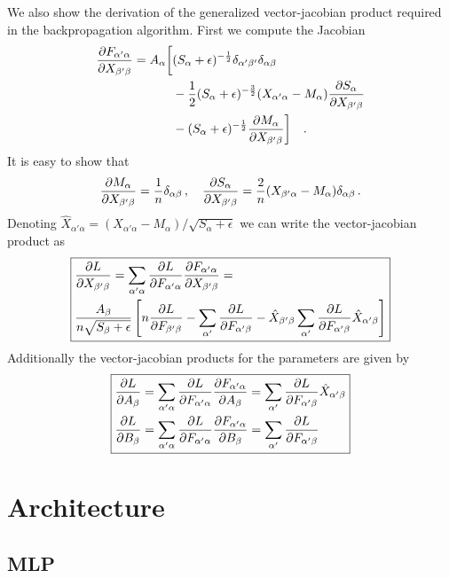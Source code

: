\documentclass{myclass}
\begin{document}
We also show the derivation of the generalized vector-jacobian product required in the
backpropagation algorithm. First we compute the Jacobian
\[
\begin{split}
   \pdv{F_{\alpha'\alpha}}{X_{\beta'\beta}} = A_\alpha \bigg[ 
                                            & (S_\alpha + \epsilon)^{-\frac{1}{2}} \delta_{\alpha'\beta'} \delta_{\alpha\beta} \\
                                            & - \frac{1}{2}(S_\alpha + \epsilon)^{-\frac{3}{2}} (X_{\alpha'\alpha} - M_\alpha) \pdv{S_\alpha}{X_{\beta'\beta}} \\
                                            & - (S_\alpha + \epsilon)^{-\frac{1}{2}} \pdv{M_\alpha}{X_{\beta'\beta}}
                                            \bigg]\quad.
\end{split}
\]
It is easy to show that 
\[
   \pdv{M_\alpha}{X_{\beta'\beta}} = \frac{1}{n} \delta_{\alpha\beta}\,,\quad \pdv{S_\alpha}{X_{\beta'\beta}} = \frac{2}{n}(X_{\beta'\alpha} - M_\alpha) \delta_{\alpha\beta} \,.
\]
Denoting \(\hat{X}_{\alpha'\alpha} = (X_{\alpha'\alpha} - M_\alpha) / \sqrt{S_\alpha + \epsilon}\)
we can write the vector-jacobian product as
\[
\boxed
{
\begin{split}
   &\pdv{L}{X_{\beta'\beta}} = \sum_{\alpha'\alpha} \pdv{L}{F_{\alpha'\alpha}} \pdv{F_{\alpha'\alpha}}{X_{\beta'\beta}} =\\
   &\frac{A_\beta}{n\sqrt{S_\beta + \epsilon}} \left[ n \pdv{L}{F_{\beta'\beta}} - \sum_{\alpha'} \pdv{L}{F_{\alpha'\beta}} - \hat{X}_{\beta'\beta} \sum_{\alpha'} \pdv{L}{F_{\alpha'\beta}} \hat{X}_{\alpha'\beta} \right]
\end{split}
}
\]
Additionally the vector-jacobian products for the parameters are given by
\[
\boxed
{
\begin{split}
   &\pdv{L}{A_\beta} = \sum_{\alpha'\alpha} \pdv{L}{F_{\alpha'\alpha}} \pdv{F_{\alpha'\alpha}}{A_\beta} = \sum_{\alpha'} \pdv{L}{F_{\alpha'\beta}} \hat{X}_{\alpha'\beta}\\
   &\pdv{L}{B_\beta} =  \sum_{\alpha'\alpha} \pdv{L}{F_{\alpha'\alpha}} \pdv{F_{\alpha'\alpha}}{B_\beta} = \sum_{\alpha'} \pdv{L}{F_{\alpha'\beta}}
\end{split}
}
\]


\section{Architecture}

\subsection{MLP}
\end{document}

